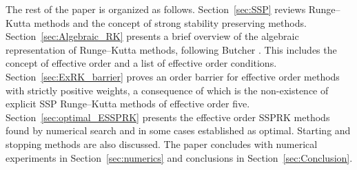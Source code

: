 The rest of the paper is organized as follows.
Section~\ref{sec:SSP} reviews Runge--Kutta methods and the concept of
strong stability preserving methods.
Section~\ref{sec:Algebraic_RK} presents a brief overview of the
algebraic representation of Runge--Kutta methods, following Butcher
\cite{Butcher2008_book}.
This includes the concept of effective order and a list of effective
order conditions.
Section~\ref{sec:ExRK_barrier} proves an order barrier for effective
order methods with strictly positive weights, a consequence of which
is the non-existence of explicit SSP Runge--Kutta methods of effective
order five.
Section~\ref{sec:optimal_ESSPRK} presents the effective order SSPRK
methods found by numerical search and in some cases established as
optimal.
Starting and stopping methods are also discussed.
The paper concludes with numerical experiments in
Section~\ref{sec:numerics} and conclusions in
Section~\ref{sec:Conclusion}.
